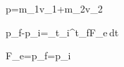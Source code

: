 \mathbf p=m_1\mathbf v_1+m_2\mathbf v_2

\mathbf p_f-\mathbf p_i=\int_{t_i}^{t_f}\mathbf F_e\,dt

\mathbf F_e=\quad\Longrightarrow\quad\mathbf p_f=\mathbf p_i

